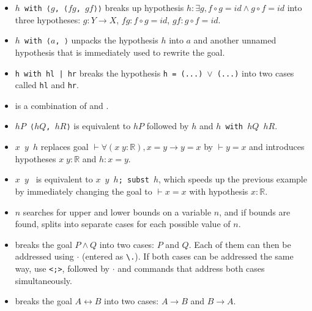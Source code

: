 \documentclass[a4paper]{article}
\newcommand{\R}{\mathbb{R}}
\begin{document}

\begin{itemize}
    \item \texttt{\rcases $h$ with ⟨$g$, ⟨$fg$, $gf$⟩⟩} breaks up hypothesis \texttt{$h : \exists g, f \circ g = id \wedge g \circ f = id$} into three hypotheses: $g : Y \to X$, $fg : f \circ g = id$, $gf : g \circ f = id$.
    \item \texttt{\rcases $h$ with ⟨$a$, \rfl{}⟩} unpacks the hypothesis $h$ into $a$ and another unnamed hypothesis that is immediately used to rewrite the goal.
    \item \texttt{\rcases h with hl | hr} breaks the hypothesis \texttt{h = (...)$\;\lor\;$(...)} into two cases called \texttt{hl} and \texttt{hr}.
\end{itemize}


\begin{itemize}
    \item \rintro is a combination of \intro and \rcases.
    \item \texttt{\rintro $hP$ ⟨$hQ$, $hR$⟩} is equivalent to \texttt{\intro $hP$} followed by \texttt{\intro $h$} and \texttt{\casesp $h$ with $hQ$ $hR$}.
    \item \texttt{\rintro $x$ $y$ $h$} replaces goal \texttt{$\vdash \forall (x \; y : \R), x = y \to y = x$} by $\vdash y = x$ and introduces hypotheses $x \; y : \R$ and $h : x = y$.
    \item \texttt{\rintro $x$ $y$ \rfl} is equivalent to \texttt{\rintro $x$ $y$ $h$; subst $h$}, which speeds up the previous example by immediately changing the goal to $\vdash x = x$ with hypothesis $x : \R$.
\end{itemize}


\begin{itemize}
    \item \texttt{\intervalcases $n$} searches for upper and lower bounds on a variable $n$, and if bounds are found, splits into separate cases for each possible value of $n$.
\end{itemize}


\begin{itemize}
    \item \constructor breaks the goal $P \wedge Q$ into two cases: $P$ and $Q$.
    Each of them can then be addressed using $\cdot$ (entered as \verb|\.|).
    If both cases can be addressed the same way, use \texttt{\constructor <;>},
    followed by $\cdot$ and commands that address both cases simultaneously.
    \item \constructor breaks the goal $A \leftrightarrow B$ into two cases: $A \to B$ and $B \to A$.
\end{itemize}
\end{document}
